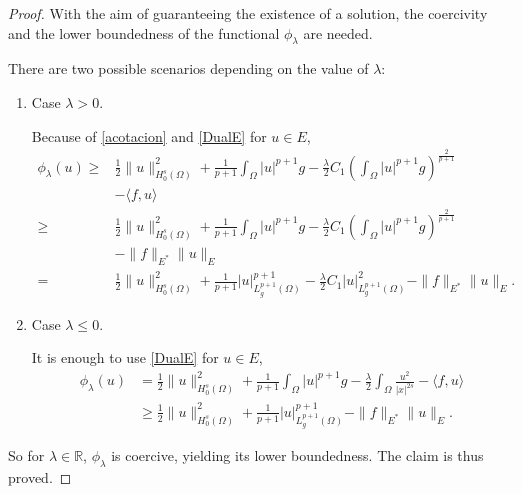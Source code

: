 \documentclass[10pt,a4paper]{amsart}
\begin{document}
		\begin{proof}
			With the aim of guaranteeing the existence of a solution,  the coercivity and the lower boundedness of the functional $\phi_{\lambda}$ are needed.\par
			There are two possible scenarios depending on the value of $\lambda$:
			\begin{enumerate}
				\item[a)] Case $\lambda>0$.\par 
				Because of \eqref{acotacion} and \eqref{DualE} for $u\in E$, 
				\begin{align*}
					\phi_{\lambda} (u)\geq&  \frac{1}{2}\|u\|^2_{H^s_0(\Omega)}+\frac{1}{p+1}\int_{\Omega}|u|^{p+1}g-\frac{\lambda}{2}C_1\left(\int_{\Omega}|u|^{p+1}g\right)^{\frac{2}{p+1}}\\&-\langle f,u\rangle\\
					\geq& \frac{1}{2}\|u\|^2_{H^s_0(\Omega)}+\frac{1}{p+1}\int_{\Omega}|u|^{p+1}g-\frac{\lambda}{2} C_1\left(\int_{\Omega}|u|^{p+1}g\right)^{\frac{2}{p+1}}\\&-\| f\|_{E^*}\|u\|_{E}\\
					=&\frac{1}{2}\|u\|^2_{H^s_0(\Omega)}+\frac{1}{p+1}|u|^{p+1}_{L^{p+1}_g(\Omega)}-\frac{\lambda}{2}C_1|u|^2_{L^{p+1}_g(\Omega)}-\| f\|_{E^*}\|u\|_{E}.
				\end{align*}
				
				\item[b)] Case $\lambda\leq 0$.\par 
				It is enough to use \eqref{DualE} for $u\in E$, 
				\begin{align*}
					\phi_{\lambda} (u)&= \frac{1}{2}\|u\|^2_{H^s_0(\Omega)}+\frac{1}{p+1}\int_{\Omega}|u|^{p+1}g-\frac{\lambda}{2} \int_{\Omega}\frac{u^2}{|x|^{2s}}-\langle f,u\rangle\\
					&\geq \frac{1}{2}\|u\|^2_{H^s_0(\Omega)}+\frac{1}{p+1}|u|^{p+1}_{L^{p+1}_g(\Omega)}-\| f\|_{E^*}\|u\|_{E}.
				\end{align*}
			\end{enumerate}
			So for $\lambda\in \mathbb{R}$, $\phi_{\lambda}$ is coercive, yielding its lower boundedness. The claim is thus proved.
			

\end{proof}
\end{document}
